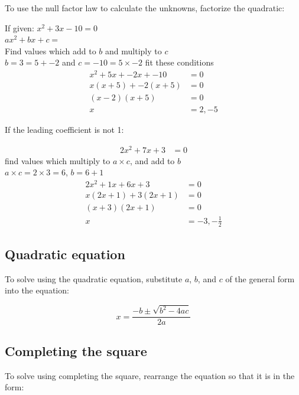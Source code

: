 \documentclass{book}
\begin{document}
To use the null factor law to calculate the unknowns, factorize the quadratic:

\begin{center}
	If given: $x^2 + 3x - 10 = 0$\\
	$ax^2 + bx + c = $\\
	Find values which add to $b$ and multiply to $c$\\
	$b = 3 = 5 + -2$ and $c = -10 = 5 \times -2$ fit these conditions
	\begin{align*}
		x^2 + 5x + -2x + -10 & = 0     \\
		x(x + 5) + -2(x + 5) & = 0     \\
		(x - 2)(x + 5)       & = 0     \\
		x                    & = 2, -5
	\end{align*}
\end{center}

If the leading coefficient is not 1:

\begin{center}
	\begin{align*}
		2x^2 + 7x + 3 & = 0
	\end{align*}
	find values which multiply to $a \times c$, and add to $b$\\
	$a \times c = 2 \times 3 = 6$, $b = 6 + 1$
	\begin{align*}
		2x^2 + 1x + 6x + 3    & = 0                \\
		x(2x + 1) + 3(2x + 1) & = 0                \\
		(x + 3)(2x + 1)       & = 0                \\
		x                     & = -3, -\frac{1}{2}
	\end{align*}
\end{center}


\subsection{Quadratic equation}
To solve using the quadratic equation, substitute $a$, $b$, and $c$ of the general form into the equation:

\[
	x = \frac{-b \pm \sqrt{b^2 - 4ac}}{2a}
\]


\subsection{Completing the square}
To solve using completing the square, rearrange the equation so that it is in the form:
\end{document}
